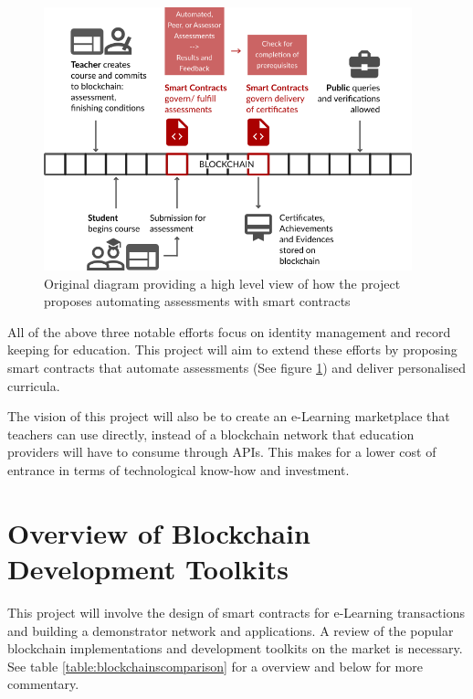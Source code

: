 \begin{figure}[!h] 
    \centering    
    \includegraphics[width=0.95\textwidth]{moocon}
    \caption[How smart contracts automates assessments]
        {Original diagram providing a high level view of how the project proposes automating assessments 
        with smart contracts}
    \label{fig:moocon_assess}
\end{figure}

All of the above three notable efforts focus on identity management and record keeping for education. 
This project will aim to extend these efforts by proposing smart contracts that automate assessments 
(See figure \ref{fig:moocon_assess}) and deliver personalised curricula. 

The vision of this project will also be to create an e-Learning marketplace that teachers can use directly, 
instead of a blockchain network that education providers will have to consume through APIs. This makes for a 
lower cost of entrance in terms of technological know-how and investment.

\section{Overview of Blockchain Development Toolkits}

This project will involve the design of smart contracts for e-Learning transactions and building a demonstrator 
network and applications. A review of the popular blockchain implementations and development toolkits on the 
market is necessary. See table \ref{table:blockchainscomparison} for a overview and below for more commentary.

